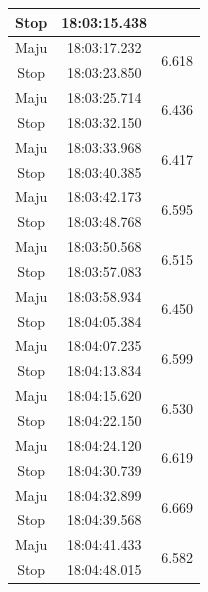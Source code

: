 \begin{longtable}{|c|c|c|}
  Stop           & 18:03:15.438        &                         \\ \hline
  Maju           & 18:03:17.232        & \multirow{2}{*}{6.618}  \\ \cline{1-2}
  Stop           & 18:03:23.850        &                         \\ \hline
  Maju           & 18:03:25.714        & \multirow{2}{*}{6.436}  \\ \cline{1-2}
  Stop           & 18:03:32.150        &                         \\ \hline
  Maju           & 18:03:33.968        & \multirow{2}{*}{6.417}  \\ \cline{1-2}
  Stop           & 18:03:40.385        &                         \\ \hline
  Maju           & 18:03:42.173        & \multirow{2}{*}{6.595}  \\ \cline{1-2}
  Stop           & 18:03:48.768        &                         \\ \hline
  Maju           & 18:03:50.568        & \multirow{2}{*}{6.515}  \\ \cline{1-2}
  Stop           & 18:03:57.083        &                         \\ \hline
  Maju           & 18:03:58.934        & \multirow{2}{*}{6.450}  \\ \cline{1-2}
  Stop           & 18:04:05.384        &                         \\ \hline
  Maju           & 18:04:07.235        & \multirow{2}{*}{6.599}  \\ \cline{1-2}
  Stop           & 18:04:13.834        &                         \\ \hline
  Maju           & 18:04:15.620        & \multirow{2}{*}{6.530}  \\ \cline{1-2}
  Stop           & 18:04:22.150        &                         \\ \hline
  Maju           & 18:04:24.120        & \multirow{2}{*}{6.619}  \\ \cline{1-2}
  Stop           & 18:04:30.739        &                         \\ \hline
  Maju           & 18:04:32.899        & \multirow{2}{*}{6.669}  \\ \cline{1-2}
  Stop           & 18:04:39.568        &                         \\ \hline
  Maju           & 18:04:41.433        & \multirow{2}{*}{6.582}  \\ \cline{1-2}
  Stop           & 18:04:48.015        &                         \\ \hline

\end{longtable}
